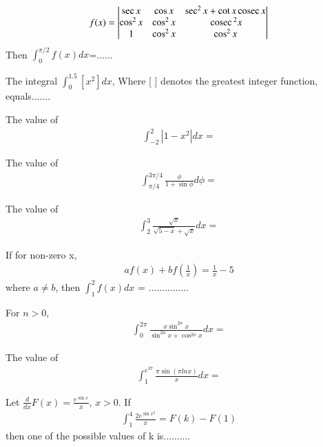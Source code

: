 \item 
\begin{align*}
f(x) = \begin{vmatrix}
\sec x & \cos x & \sec^{2}x + \cot x \,\text{cosec}\, x \\ \cos^{2}x & \cos^{2}x & \,\text{cosec}\,^{2}x \\ 1 & \cos^{2}x & \cos^{2}x
\end{vmatrix}
\end{align*}
Then $\int_{0}^{\pi/2}f(x)dx$=......

\item The integral $\int_{0}^{1.5}[x^{2}]dx$, Where [ ] denotes the greatest integer function, equals.......

\item The value of 
\begin{align*}
\int_{-2}^{2}|1 - x^{2}|dx = 
\end{align*}

\item The value of 
\begin{align*}
\int_{\pi/4}^{3\pi/4}\frac{\phi}{1 + \sin\phi}d\phi = 
\end{align*}

\item The value of 
\begin{align*}
\int_{2}^{3}\frac{\sqrt{x}}{\sqrt{5 - x} + \sqrt{x}}dx = 
\end{align*}

\item If for non-zero x, 
\begin{align*}
af(x) + bf\left(\frac{1}{x}\right) = \frac{1}{x} - 5
\end{align*}
where $a \neq b$, then $\int_{1}^{2}f(x)dx$ = ...............

\item For $n > 0$, 
\begin{align*}
\int_{0}^{2\pi}\frac{x\sin^{2n}x}{\sin^{2n}x + \cos^{2n}x}dx = 
\end{align*}

\item The value of 
\begin{align*}
\int_{1}^{e^{37}}\frac{\pi \sin(\pi lnx)}{x}dx = 
\end{align*}

\item Let $\frac{d}{dx}F(x) = \frac{e^{\sin x}}{x}$, $x > 0$. If
\begin{align*}
\int_{1}^{4} \frac{2e^{\sin x^{2}}}{x} = F(k) - F(1)
\end{align*}
then one of the possible values of k is..........


